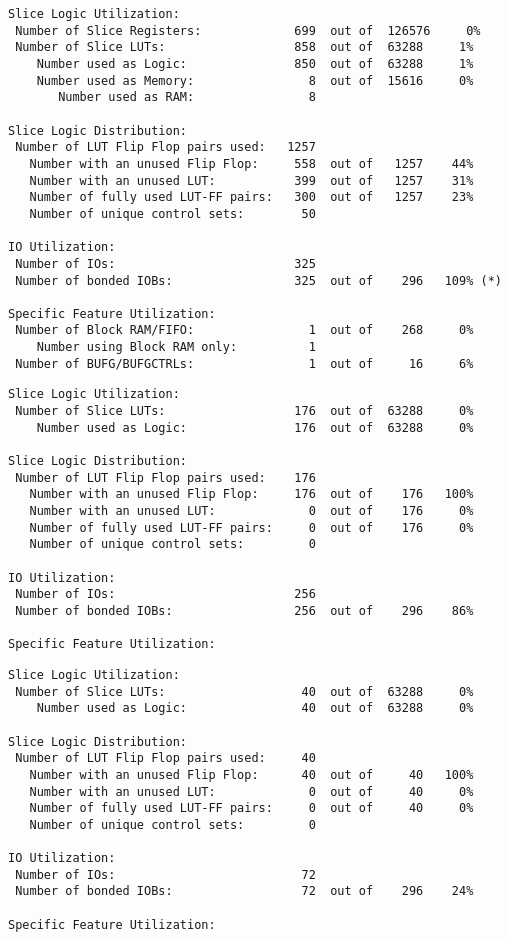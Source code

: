 \begin{verbatim}
Slice Logic Utilization: 
 Number of Slice Registers:             699  out of  126576     0%  
 Number of Slice LUTs:                  858  out of  63288     1%  
    Number used as Logic:               850  out of  63288     1%  
    Number used as Memory:                8  out of  15616     0%  
       Number used as RAM:                8

Slice Logic Distribution: 
 Number of LUT Flip Flop pairs used:   1257
   Number with an unused Flip Flop:     558  out of   1257    44%  
   Number with an unused LUT:           399  out of   1257    31%  
   Number of fully used LUT-FF pairs:   300  out of   1257    23%  
   Number of unique control sets:        50

IO Utilization: 
 Number of IOs:                         325
 Number of bonded IOBs:                 325  out of    296   109% (*) 

Specific Feature Utilization:
 Number of Block RAM/FIFO:                1  out of    268     0%  
    Number using Block RAM only:          1
 Number of BUFG/BUFGCTRLs:                1  out of     16     6%  
\end{verbatim}

\begin{verbatim}
Slice Logic Utilization: 
 Number of Slice LUTs:                  176  out of  63288     0%  
    Number used as Logic:               176  out of  63288     0%  

Slice Logic Distribution: 
 Number of LUT Flip Flop pairs used:    176
   Number with an unused Flip Flop:     176  out of    176   100%  
   Number with an unused LUT:             0  out of    176     0%  
   Number of fully used LUT-FF pairs:     0  out of    176     0%  
   Number of unique control sets:         0

IO Utilization: 
 Number of IOs:                         256
 Number of bonded IOBs:                 256  out of    296    86%  

Specific Feature Utilization:
\end{verbatim}

\begin{verbatim}
Slice Logic Utilization: 
 Number of Slice LUTs:                   40  out of  63288     0%  
    Number used as Logic:                40  out of  63288     0%  

Slice Logic Distribution: 
 Number of LUT Flip Flop pairs used:     40
   Number with an unused Flip Flop:      40  out of     40   100%  
   Number with an unused LUT:             0  out of     40     0%  
   Number of fully used LUT-FF pairs:     0  out of     40     0%  
   Number of unique control sets:         0

IO Utilization: 
 Number of IOs:                          72
 Number of bonded IOBs:                  72  out of    296    24%  

Specific Feature Utilization:
\end{verbatim}

